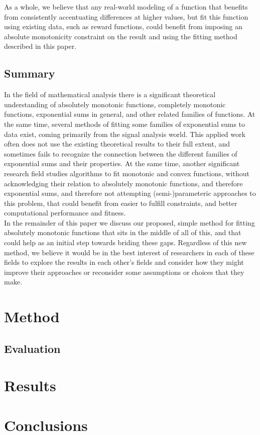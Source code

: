 \documentclass[12pt,a4paper]{article}
\begin{document}
As a whole, we believe that any real-world modeling of a function that benefits from consistently accentuating differences at higher values, but fit this function using existing data, such as reward functions, could benefit from imposing an absolute monotonicity constraint on the result and using the fitting method described in this paper.

\subsection{Summary}

In the field of mathematical analysis there is a significant theoretical understanding of absolutely monotonic functions, completely monotonic functions, exponential sums in general, and other related families of functions. At the same time, several methods of fitting some families of exponential sums to data exist, coming primarily from the signal analysis world. This applied work often does not use the existing theoretical results to their full extent, and sometimes fails to recognize the connection between the different families of exponential sums and their properties. At the same time, another significant research field studies algorithms to fit monotonic and convex functions, without acknowledging their relation to absolutely monotonic functions, and therefore exponential sums, and therefore not attempting (semi-)parameteric approaches to this problem, that could benefit from easier to fulfill constraints, and better computational performance and fitness.\\

In the remainder of this paper we discuss our proposed, simple method for fitting absolutely monotonic functions that sits in the middle of all of this, and that could help as an initial step towards briding these gaps. Regardless of this new method, we believe it would be in the best interest of researchers in each of these fields to explore the results in each other's fields and consider how they might improve their approaches or reconsider some assumptions or choices that they make.

\section{Method}
\label{method}

\subsection{Evaluation}

\section{Results}

\section{Conclusions}

\dobibliography
\end{document}

